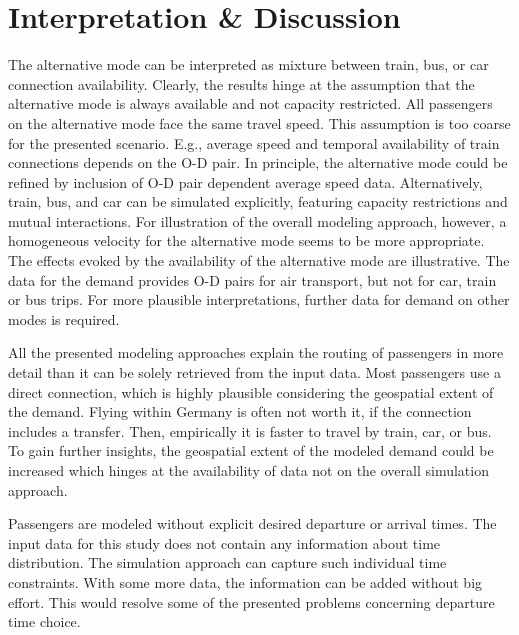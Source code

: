 \section{Interpretation \& Discussion}
\label{sec:air_rail_discussion}
The alternative mode can be interpreted as mixture between train, bus, or car connection availability. 
Clearly, the results hinge at the assumption that the alternative mode is always available and not capacity restricted.  
All passengers on the alternative mode face the same travel speed. 
This assumption is too coarse for the presented scenario. 
E.g., average speed and temporal availability of train connections depends on the O-D pair. 
In principle, the alternative mode could be refined by inclusion of O-D pair dependent average speed data. 
Alternatively, train, bus, and car can be simulated explicitly, featuring capacity restrictions and mutual interactions. 
For illustration of the overall modeling approach, however, a homogeneous velocity for the alternative mode seems to be more appropriate. 
The effects evoked by the availability of the alternative mode are illustrative. 
The data for the demand provides O-D pairs for air transport, but not for car, train or bus trips.  
For more plausible interpretations, further data for demand on other modes is required. 


All the presented modeling approaches explain the routing of passengers in more detail than it can be solely retrieved from the input data.  
Most passengers use a direct connection, which is highly plausible considering the geospatial extent of the demand.  
Flying within Germany is often not worth it, if the connection includes a transfer. 
Then, empirically it is faster to travel by train, car, or bus. 
To gain further insights, the geospatial extent of the modeled demand could be increased which hinges at the availability of data not on the overall simulation approach. 

Passengers are modeled without explicit desired departure or arrival times. 
The input data for this study does not contain any information about time distribution. 
The simulation approach can capture such individual time constraints.  
With some more data, the information can be added without big effort. 
This would resolve some of the presented problems concerning departure time choice. 

